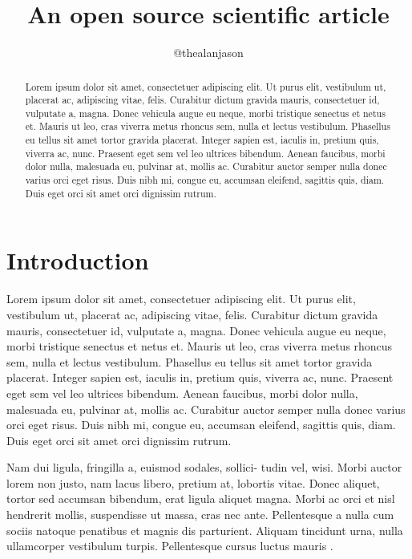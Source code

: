 \documentclass[twocolumn]{aastex631}
\begin{document}
\title{An open source scientific article}

\author{@thealanjason}

\begin{abstract}
    Lorem ipsum dolor sit amet, consectetuer adipiscing elit.
    Ut purus elit, vestibulum ut, placerat ac, adipiscing vitae, felis.
    Curabitur dictum gravida mauris, consectetuer id, vulputate a, magna.
    Donec vehicula augue eu neque, morbi tristique senectus et netus et.
    Mauris ut leo, cras viverra metus rhoncus sem, nulla et lectus vestibulum.
    Phasellus eu tellus sit amet tortor gravida placerat.
    Integer sapien est, iaculis in, pretium quis, viverra ac, nunc.
    Praesent eget sem vel leo ultrices bibendum.
    Aenean faucibus, morbi dolor nulla, malesuada eu, pulvinar at, mollis ac.
    Curabitur auctor semper nulla donec varius orci eget risus.
    Duis nibh mi, congue eu, accumsan eleifend, sagittis quis, diam.
    Duis eget orci sit amet orci dignissim rutrum.
\end{abstract}

\section{Introduction}
\label{sec:intro}

Lorem ipsum dolor sit amet, consectetuer adipiscing elit.
Ut purus elit, vestibulum ut, placerat ac, adipiscing vitae, felis.
Curabitur dictum gravida mauris, consectetuer id, vulputate a, magna.
Donec vehicula augue eu neque, morbi tristique senectus et netus et.
Mauris ut leo, cras viverra metus rhoncus sem, nulla et lectus vestibulum.
Phasellus eu tellus sit amet tortor gravida placerat.
Integer sapien est, iaculis in, pretium quis, viverra ac, nunc.
Praesent eget sem vel leo ultrices bibendum.
Aenean faucibus, morbi dolor nulla, malesuada eu, pulvinar at, mollis ac.
Curabitur auctor semper nulla donec varius orci eget risus.
Duis nibh mi, congue eu, accumsan eleifend, sagittis quis, diam.
Duis eget orci sit amet orci dignissim rutrum.

Nam dui ligula, fringilla a, euismod sodales, sollici- tudin vel, wisi.
Morbi auctor lorem non justo, nam lacus libero, pretium at, lobortis vitae.
Donec aliquet, tortor sed accumsan bibendum, erat ligula aliquet magna.
Morbi ac orci et nisl hendrerit mollis, suspendisse ut massa, cras nec ante.
Pellentesque a nulla cum sociis natoque penatibus et magnis dis parturient.
Aliquam tincidunt urna, nulla ullamcorper vestibulum turpis.
Pellentesque cursus luctus mauris \citep{Luger2021}.


\end{document}
